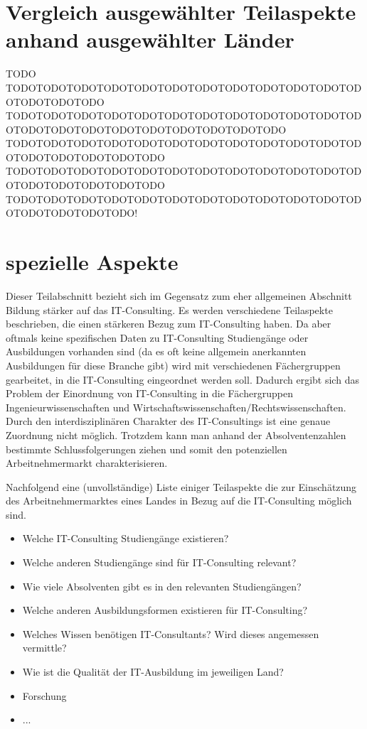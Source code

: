 \section{Vergleich ausgewählter Teilaspekte anhand ausgewählter Länder}
TODO TODOTODOTODOTODOTODOTODOTODOTODOTODOTODOTODOTODOTODOTODOTODO
TODOTODOTODOTODOTODOTODOTODOTODOTODOTODOTODOTODOTODOTODOTODOTODOTODOTODOTODOTODOTODO
TODOTODOTODOTODOTODOTODOTODOTODOTODOTODOTODOTODOTODOTODOTODOTODOTODO
TODOTODOTODOTODOTODOTODOTODOTODOTODOTODOTODOTODOTODOTODOTODOTODOTODO
TODOTODOTODOTODOTODOTODOTODOTODOTODOTODOTODOTODOTODOTODOTODOTODO!

 \section{spezielle Aspekte}
Dieser Teilabschnitt bezieht sich im Gegensatz zum eher allgemeinen Abschnitt Bildung stärker auf das IT-Consulting. Es werden verschiedene Teilaspekte beschrieben, die einen stärkeren Bezug zum IT-Consulting haben. Da aber oftmals keine spezifischen Daten zu IT-Consulting Studiengänge oder Ausbildungen vorhanden sind (da es oft keine allgemein anerkannten Ausbildungen für diese Branche gibt) wird mit verschiedenen Fächergruppen gearbeitet, in die IT-Consulting eingeordnet werden soll. 
Dadurch ergibt sich das Problem der Einordnung von IT-Consulting in die Fächergruppen Ingenieurwissenschaften und Wirtschaftswissenschaften/Rechtswissenschaften. Durch den interdisziplinären Charakter des IT-Consultings ist eine genaue Zuordnung nicht möglich. Trotzdem kann man anhand der Absolventenzahlen bestimmte Schlussfolgerungen ziehen und somit den potenziellen Arbeitnehmermarkt charakterisieren.

Nachfolgend eine (unvollständige) Liste einiger Teilaspekte die zur Einschätzung des Arbeitnehmermarktes eines Landes in Bezug auf die IT-Consulting möglich sind. 
\begin{itemize} 
\item Welche IT-Consulting Studiengänge existieren?
\item Welche anderen Studiengänge sind für IT-Consulting relevant?
\item Wie viele Absolventen gibt es in den relevanten Studiengängen?
\item Welche anderen Ausbildungsformen existieren für IT-Consulting?
\item Welches Wissen benötigen IT-Consultants? Wird dieses angemessen vermittle?
\item Wie ist die Qualität der IT-Ausbildung im jeweiligen Land?
\item Forschung
\item ...
\end{itemize}

